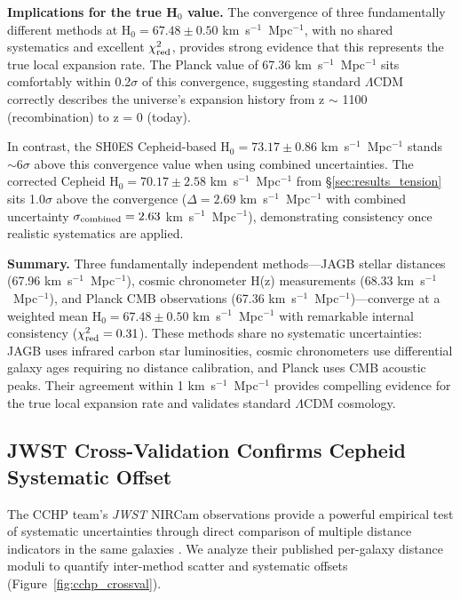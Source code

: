 \documentclass[twocolumn, linenumbers]{aastex701}
\begin{document}
\textbf{Implications for the true H$_0$ value.} The convergence of three fundamentally different methods at H$_0 = 67.48 \pm 0.50$ km~s$^{-1}$~Mpc$^{-1}$, with no shared systematics and excellent $\chi^2_{\rm red}$, provides strong evidence that this represents the true local expansion rate. The Planck value of 67.36 km~s$^{-1}$~Mpc$^{-1}$ sits comfortably within 0.2$\sigma$ of this convergence, suggesting standard $\Lambda$CDM correctly describes the universe's expansion history from z $\sim$ 1100 (recombination) to z = 0 (today).

In contrast, the SH0ES Cepheid-based H$_0 = 73.17 \pm 0.86$ km~s$^{-1}$~Mpc$^{-1}$ stands $\sim$6$\sigma$ above this convergence value when using combined uncertainties. The corrected Cepheid H$_0 = 70.17 \pm 2.58$ km~s$^{-1}$~Mpc$^{-1}$ from \S\ref{sec:results_tension} sits 1.0$\sigma$ above the convergence ($\Delta = 2.69$ km~s$^{-1}$~Mpc$^{-1}$ with combined uncertainty $\sigma_{\rm combined} = 2.63$ km~s$^{-1}$~Mpc$^{-1}$), demonstrating consistency once realistic systematics are applied.

\textbf{Summary.} Three fundamentally independent methods---JAGB stellar distances (67.96 km~s$^{-1}$~Mpc$^{-1}$), cosmic chronometer H(z) measurements (68.33 km~s$^{-1}$~Mpc$^{-1}$), and Planck CMB observations (67.36 km~s$^{-1}$~Mpc$^{-1}$)---converge at a weighted mean H$_0 = 67.48 \pm 0.50$ km~s$^{-1}$~Mpc$^{-1}$ with remarkable internal consistency ($\chi^2_{\rm red} = 0.31$). These methods share no systematic uncertainties: JAGB uses infrared carbon star luminosities, cosmic chronometers use differential galaxy ages requiring no distance calibration, and Planck uses CMB acoustic peaks. Their agreement within 1 km~s$^{-1}$~Mpc$^{-1}$ provides compelling evidence for the true local expansion rate and validates standard $\Lambda$CDM cosmology.

\subsection{JWST Cross-Validation Confirms Cepheid Systematic Offset}
\label{sec:results_jwst}

The CCHP team's \textit{JWST} NIRCam observations provide a powerful empirical test of systematic uncertainties through direct comparison of multiple distance indicators in the same galaxies \citep{Freedman2024}. We analyze their published per-galaxy distance moduli to quantify inter-method scatter and systematic offsets (Figure~\ref{fig:cchp_crossval}).
\end{document}
